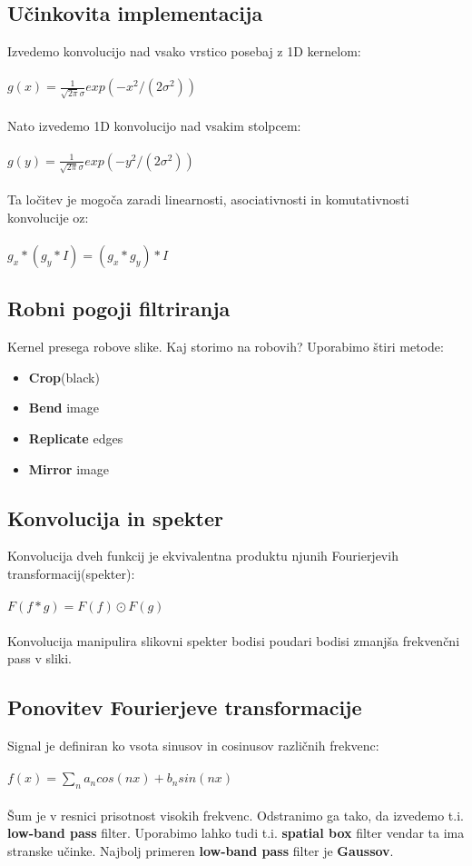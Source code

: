 \documentclass[11pt]{article}
\begin{document}
\newpage

\subsection{U\v{c}inkovita implementacija}
Izvedemo konvolucijo nad vsako vrstico posebaj z 1D kernelom: \\
\\
\indent $g(x) = \frac{1}{\sqrt{2\pi}\sigma}exp(-x^2 / (2\sigma^2))$ \\
\\
Nato izvedemo 1D konvolucijo nad vsakim stolpcem: \\
\\
\indent $g(y) = \frac{1}{\sqrt{2\pi}\sigma}exp(-y^2/(2\sigma^2))$ \\
\\
Ta lo\v{c}itev je mogo\v{c}a zaradi linearnosti, asociativnosti in komutativnosti konvolucije oz: \\
\\
\indent $g_x * (g_y * I) = (g_x * g_y) * I$

\subsection{Robni pogoji filtriranja}
Kernel presega robove slike. Kaj storimo na robovih? Uporabimo \v{s}tiri metode:
\begin{itemize}
\item \textbf{Crop}(black)
\item \textbf{Bend} image
\item \textbf{Replicate} edges
\item \textbf{Mirror} image
\end{itemize}

\subsection{Konvolucija in spekter}
Konvolucija dveh funkcij je ekvivalentna produktu njunih Fourierjevih transformacij(spekter): \\
\\
\indent $F(f * g) = F(f) \odot F(g)$ \\
\\
Konvolucija manipulira slikovni spekter bodisi poudari bodisi zmanj\v{s}a frekven\v{c}ni pass v sliki.

\newpage

\subsection{Ponovitev Fourierjeve transformacije}
Signal je definiran ko vsota sinusov in cosinusov razli\v{c}nih frekvenc: \\
\\
\indent $f(x) = \sum\limits_n a_ncos(nx) + b_nsin(nx)$ \\
\\
\v{S}um je v resnici prisotnost visokih frekvenc. Odstranimo ga tako, da izvedemo t.i. \textbf{low-band pass} filter. Uporabimo lahko tudi t.i. \textbf{spatial box} filter vendar ta ima stranske u\v{c}inke. Najbolj primeren \textbf{low-band pass} filter je \textbf{Gaussov}.
\end{document}
